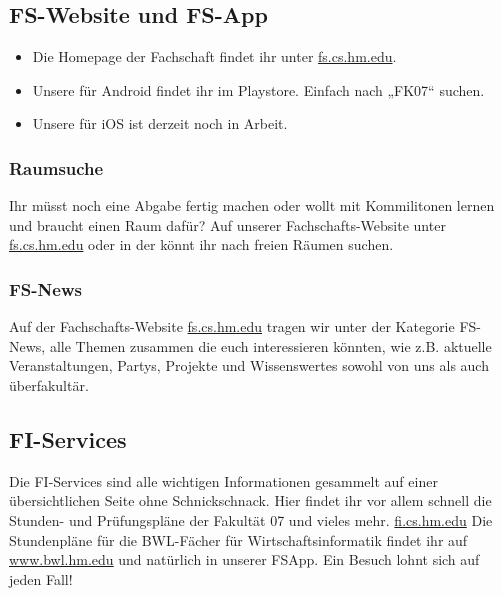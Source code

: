 \subsection{FS-Website und FS-App}
\begin{itemize}
	\item Die Homepage der Fachschaft findet ihr unter \url{fs.cs.hm.edu}.
	\item Unsere  für Android findet ihr im Playstore. 
	Einfach nach „FK07“ suchen.
	\item Unsere  für iOS ist derzeit noch in Arbeit.
\end{itemize}

\subsubsection{Raumsuche}
Ihr müsst noch eine Abgabe fertig machen oder wollt mit Kommilitonen 
lernen und braucht einen Raum dafür? Auf unserer Fachschafts-Website unter \url{fs.cs.hm.edu} \arrow {} \arrow {} oder in der
 könnt ihr nach freien Räumen suchen.

\subsubsection{FS-News}
Auf der Fachschafts-Website \url{fs.cs.hm.edu} tragen wir unter der Kategorie FS-News,
alle Themen zusammen die euch interessieren könnten, wie z.B. 
aktuelle Veranstaltungen, Partys, Projekte und Wissenswertes sowohl 
von uns als auch überfakultär. 

\subsection{FI-Services}
Die FI-Services sind alle wichtigen Informationen gesammelt auf einer 
übersichtlichen Seite ohne Schnickschnack. Hier findet ihr vor allem 
schnell die Stunden- und Prüfungspläne der Fakultät 07 und vieles mehr.
\url{fi.cs.hm.edu}\doublebreak
Die Stundenpläne für die BWL-Fächer für Wirtschaftsinformatik 
findet ihr auf \url{www.bwl.hm.edu} \arrow {} und natürlich in unserer FSApp.
Ein Besuch lohnt sich auf jeden Fall!

